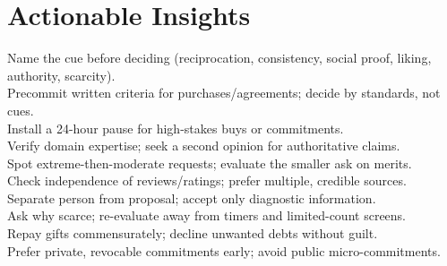 \section*{Actionable Insights}
\begin{Form}
  \CheckBox[name=01]{} Name the cue before deciding (reciprocation, consistency, social proof, liking, authority, scarcity).\\
  \CheckBox[name=02]{} Precommit written criteria for purchases/agreements; decide by standards, not cues.\\
  \CheckBox[name=03]{} Install a 24-hour pause for high-stakes buys or commitments.\\
  \CheckBox[name=04]{} Verify domain expertise; seek a second opinion for authoritative claims.\\
  \CheckBox[name=05]{} Spot extreme-then-moderate requests; evaluate the smaller ask on merits.\\
  \CheckBox[name=06]{} Check independence of reviews/ratings; prefer multiple, credible sources.\\
  \CheckBox[name=07]{} Separate person from proposal; accept only diagnostic information.\\
  \CheckBox[name=08]{} Ask why scarce; re-evaluate away from timers and limited-count screens.\\
  \CheckBox[name=09]{} Repay gifts commensurately; decline unwanted debts without guilt.\\
  \CheckBox[name=10]{} Prefer private, revocable commitments early; avoid public micro-commitments.
\end{Form}
